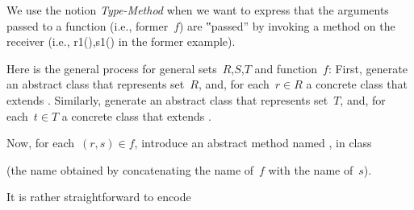 We use the notion \emph{Type-Method} when we want to express that the arguments passed to a function
  (i.e., former~$f$) are ‟passed” by invoking a method on the receiver (i.e., r1(),s1() in the former example).

Here is the general process for general sets~$R$,$S$,$T$ and function~$f$:
First, generate an abstract class  that represents set~$R$, and,
  for each~$r∈R$ a concrete class  that extends .
Similarly, generate an abstract class  that represents set~$T$, and,
  for each~$t∈T$ a concrete class  that extends .

Now, for each~$(r,s)∈f$, introduce an abstract method named ,
  in class~

(the name obtained by
  concatenating the name of~$f$ with the name of~$s$).

It is rather straightforward to encode
